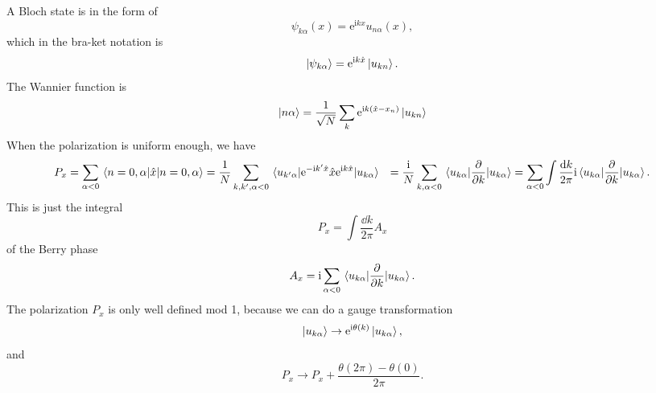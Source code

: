 \documentclass[hyperref, a4paper]{article}
\newcommand*{\ii}{\mathrm{i}}
\newcommand*{\ee}{\mathrm{e}}
\def\\{}%
\begin{document}
A Bloch state is in the form of 
\begin{equation}
    \psi_{k \alpha} (x) = \ee^{\ii k x} u_{n \alpha} (x),
\end{equation}
which in the bra-ket notation is 
\begin{equation}
    \ket{\psi_{k \alpha}} = \ee^{\ii k \hat{x}} \ket{u_{k n}}.
\end{equation}
The Wannier function is 
\begin{equation}
    \ket{n \alpha} = \frac{1}{\sqrt{N}} \sum_k \ee^{\ii k (\hat{x} - x_n)} \ket{u_{k n}}
\end{equation}
When the polarization is uniform enough, we have
\begin{equation}
    \begin{aligned}
        P_x &= \sum_{\alpha < 0} \expval{\hat{x}}{n=0, \alpha} = \frac{1}{N} \sum_{k, k', \alpha < 0} \mel{u_{k' \alpha}}{\ee^{- \ii k' \hat{x}} \hat{x} \ee^{\ii k \hat{x}} }{u_{k\alpha}} \\
        &= %
        \frac{\ii}{N} \sum_{k, \alpha < 0} \mel{u_{k \alpha}}{\pdv{k}}{u_{k \alpha}} = \sum_{\alpha < 0} \int \frac{\dd{k}}{2\pi} \ii \mel{u_{k \alpha}}{\pdv{k}}{u_{k \alpha}} .
    \end{aligned}
\end{equation}
This is just the integral 
\begin{equation}
    P_x = \int \frac{\dd{k}}{2\pi} A_x
\end{equation}
of the Berry phase
\begin{equation}
    A_x = \ii \sum_{\alpha < 0} \mel{u_{k \alpha}}{\pdv{k}}{u_{k \alpha}}.
\end{equation}
The polarization $P_x$ is only well defined mod 1, because we can do a gauge transformation
\begin{equation}
    \ket{u_{k \alpha}} \to \ee^{\ii \theta(k)} \ket{u_{k \alpha}},
\end{equation}
and 
\begin{equation}
    P_x \to P_x + \frac{\theta(2\pi) - \theta(0)}{2\pi}.
\end{equation}
\end{document}
